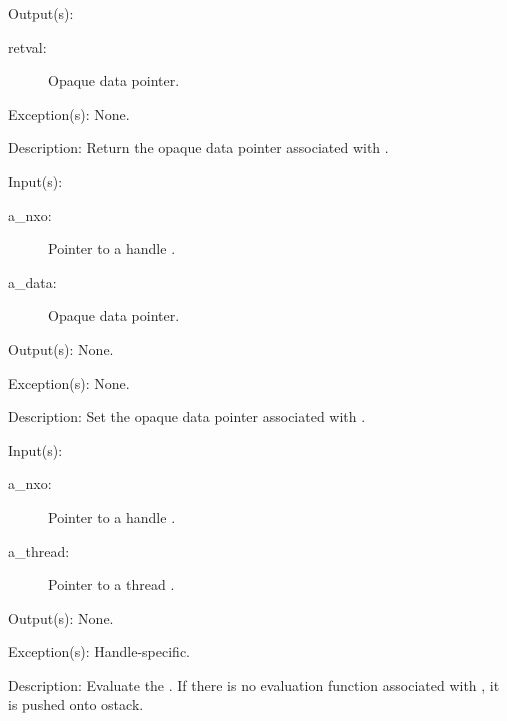 \begin{capi}
\begin{capilist}
\begin{description}
		\end{description}
	\item[Output(s): ]
		\begin{description}\item[]
		\item[retval: ]
			Opaque data pointer.
		\end{description}
	\item[Exception(s): ] None.
	\item[Description: ]
		Return the opaque data pointer associated with .
	\end{capilist}
\label{nxo_handle_data_set}
	\begin{capilist}
	\item[Input(s): ]
		\begin{description}\item[]
		\item[a\_nxo: ]
			Pointer to a handle .
		\item[a\_data: ]
			Opaque data pointer.
		\end{description}
	\item[Output(s): ] None.
	\item[Exception(s): ] None.
	\item[Description: ]
		Set the opaque data pointer associated with .
	\end{capilist}
\label{nxo_handle_eval}
	\begin{capilist}
	\item[Input(s): ]
		\begin{description}\item[]
		\item[a\_nxo: ]
			Pointer to a handle \classname{nxo}.
		\item[a\_thread: ]
			Pointer to a thread \classname{nxo}.
		\end{description}
	\item[Output(s): ] None.
	\item[Exception(s): ] Handle-specific.
	\item[Description: ]
		Evaluate the .  If there is no evaluation function
		associated with , it is pushed onto ostack.
	\end{capilist}
\end{capi}
